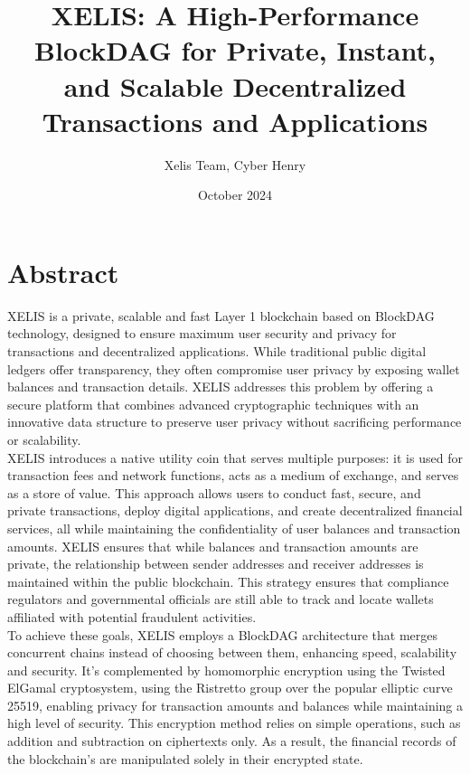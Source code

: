 \documentclass[10pt,a4paper,twocolumn]{article}
\title{XELIS: A High-Performance BlockDAG for Private, Instant, and Scalable Decentralized Transactions and Applications}
\author{Xelis Team, Cyber Henry}
\date{October 2024}
\begin{document}
\maketitle

\section{Abstract}


XELIS is a private, scalable and fast Layer 1 blockchain based on BlockDAG technology, designed to ensure maximum user security and privacy for transactions and decentralized applications. While traditional public digital ledgers offer transparency, they often compromise user privacy by exposing wallet balances and transaction details. XELIS addresses this problem by offering a secure platform that combines advanced cryptographic techniques with an innovative data structure to preserve user privacy without sacrificing performance or scalability.\\

XELIS introduces a native utility coin that serves multiple purposes: it is used for transaction fees and network functions, acts as a medium of exchange, and serves as a store of value. This approach allows users to conduct fast, secure, and private transactions, deploy digital applications, and create decentralized financial services, all while maintaining the confidentiality of user balances and transaction amounts. XELIS ensures that while balances and transaction amounts are private, the relationship between sender addresses and receiver addresses is maintained within the public blockchain. This strategy ensures that compliance regulators and governmental officials are still able to track and locate wallets affiliated with potential fraudulent activities.\\

To achieve these goals, XELIS employs a BlockDAG architecture that merges concurrent chains instead of choosing between them, enhancing speed, scalability and security. It's complemented by homomorphic encryption using the Twisted ElGamal cryptosystem, using the Ristretto group over the popular elliptic curve 25519, enabling privacy for transaction amounts and balances while maintaining a high level of security. This encryption method relies on simple operations, such as addition and subtraction on ciphertexts only. As a result, the financial records of the blockchain's are manipulated solely in their encrypted state.\\
\end{document}
